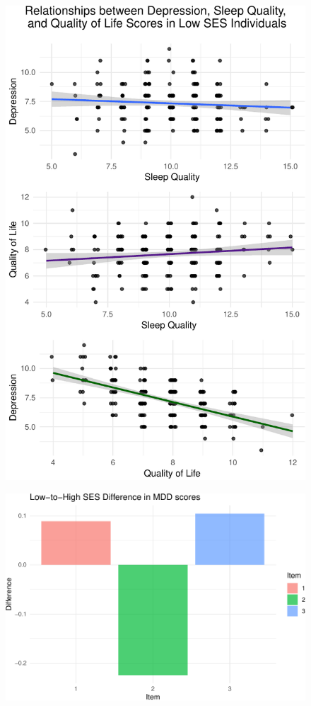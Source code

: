 \documentclass[man, noextraspace]{apa6}
\theoremstyle{definition}
\theoremstyle{definition}
\theoremstyle{definition}
\theoremstyle{remark}
\begin{document}
\begin{figure}
\centering
\includegraphics{APA_Document_files/figure-latex/plot 2-1.pdf}
\caption{}
\end{figure}

\begin{figure}
\centering
\includegraphics{APA_Document_files/figure-latex/Figure 3-1.pdf}
\caption{}
\end{figure}
\end{document}
